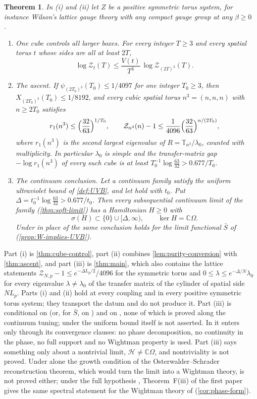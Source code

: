 \documentclass[11pt,a4paper]{amsart}
\newtheorem{theorem}{Theorem}[section]
\theoremstyle{definition}
\theoremstyle{remark}
\numberwithin{equation}{section}
\newcommand{\C}{\mathbb{C}}          %
\newcommand{\Hilb}{\mathcal{H}}      %
\newcommand{\TT}{\mathbb{T}}               %
\newcommand{\Zc}{\mathcal{Z}}              %
\newcommand{\Zs}[2]{\Zc_{#1}(#2)}          %
\newcommand{\XT}[2]{X_{#1}(#2)}            %
\newcommand{\psiT}[2]{\psi_{#1}(#2)}       %
\newcommand{\Vol}[1]{V(#1)}                %
\newcommand{\cube}[1]{(2#1)^3}             %
\newcommand{\lzero}{\lambda_0}             %
\newcommand{\dconst}{\frac{1}{4097}}       %
\newcommand{\xconst}{\frac{1}{8192}}       %
\newcommand{\dconstinl}{1/4097}            %
\newcommand{\xconstinl}{1/8192}            %
\newcommand{\Mcirc}{\text{\upshape(M$^{\circ}$)}}   %
\newcommand{\hypW}{\text{\upshape(W)}}              %
\newcommand{\UVB}{\text{\upshape(UVB)}}             %
\newcommand{\tzero}{t_0}                   %
\newcommand{\Lp}{L_p}                      %
\begin{document}
{\renewcommand{\thetheorem}{A}%
\begin{theorem}
In \textup{(i)} and \textup{(ii)} let $Z$ be a positive symmetric torus system, for instance Wilson's lattice gauge theory with any compact gauge group at any $\beta\ge0$.
\begin{enumerate}[label=\textup{(\roman*)},leftmargin=*]
\item \emph{One cube controls all larger boxes.} For every integer $T\ge3$ and every spatial torus $t$ whose sides are all at least $2T$,
\[
\log\Zs{t}{T}\le\frac{\Vol{t}}{T^{3}}\,\log\Zs{\cube{T}}{T}.
\]
\item \emph{The ascent.} If $\psiT{\cube{T_0}}{T_0}\le\dconstinl$ for one integer $T_0\ge3$, then $\XT{\cube{T_0}}{T_0}\le\xconstinl$, and every cubic spatial torus $n^3=(n,n,n)$ with $n\ge2T_0$ satisfies
\[
r_1(n^3)\le\Bigl(\frac{32}{63}\Bigr)^{1/T_0},\qquad \Zs{n^3}{n}-1\le\frac{1}{4096}\Bigl(\frac{32}{63}\Bigr)^{n/(2T_0)},
\]
where $r_1(n^3)$ is the second largest eigenvalue of $R=\TT_{n^3}/\lzero$, counted with multiplicity. In particular $\lzero$ is simple and the transfer-matrix gap $-\log r_1(n^3)$ of every such cube is at least $T_0^{-1}\log\frac{63}{32}>0.677/T_0$.
\item \emph{The continuum conclusion.} Let a continuum family satisfy the uniform ultraviolet bound \UVB{} of \cref{def:UVB}, and let \Mcirc{} hold with $\tzero$. Put $\Delta=\tzero^{-1}\log\frac{63}{32}>0.677/\tzero$. Then every subsequential continuum limit of the family \textup{(}\cref{thm:soft-limit}\textup{)} has a Hamiltonian $H\ge0$ with
\[
\sigma(H)\subset\{0\}\cup[\Delta,\infty),\qquad \ker H=\C\Omega .
\]
Under \hypW{} in place of \UVB{} the same conclusion holds for the limit functional $\bar S$ of \hypW{} \textup{(}\cref{prop:W-implies-UVB}\textup{)}.
\end{enumerate}
\end{theorem}}

Part (i) is \cref{thm:cube-control}, part (ii) combines \cref{lem:purity-conversion} with \cref{thm:ascent}, and part (iii) is \cref{thm:main}, which also contains the lattice statements $\Zc_{N,p}-1\le e^{-\Delta\Lp/2}/4096$ for the symmetric torus and $0\le\lambda\le e^{-\Delta/N}\lzero$ for every eigenvalue $\lambda\ne\lzero$ of the transfer matrix of the cylinder of spatial side $N\Lp$. Parts (i) and (ii) hold at every coupling and in every positive symmetric torus system; they transport the datum and do not produce it. Part (iii) is conditional on \UVB{} (or, for $\bar S$, on \hypW) and on \Mcirc, none of which is proved along the continuum tuning; under \hypW{} the uniform bound \UVB{} itself is not asserted. In it \hypW{} enters only through its convergence clauses: no phase decomposition, no continuity in the phase, no full support and no Wightman property is used. Part (iii) says something only about a nontrivial limit, $\Hilb\ne\C\Omega$, and nontriviality is not proved. Under \UVB{} alone the growth condition of the Osterwalder--Schrader reconstruction theorem, which would turn the limit into a Wightman theory, is not proved either; under the full hypothesis \hypW, Theorem~F(iii) of the first paper \cite{bhattacharjee2026first} gives the same spectral statement for the Wightman theory of \hypW{} (\cref{cor:phase-form}).
\end{document}
